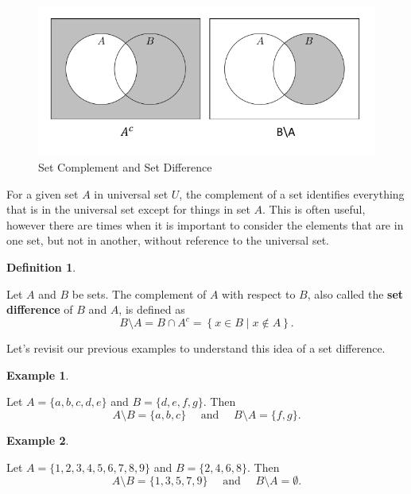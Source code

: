 \documentclass[
]{book}
\theoremstyle{definition}
\newtheorem{definition}{Definition}[chapter]
\theoremstyle{definition}
\newtheorem{example}{Example}[chapter]
\theoremstyle{definition}
\theoremstyle{definition}
\theoremstyle{remark}
\begin{document}
\begin{figure}

{\centering \includegraphics[width=0.8\linewidth]{tikz/set-difference} 

}

\caption{Set Complement and Set Difference}\label{fig:set-difference}
\end{figure}

For a given set \(A\) in universal set \(U\), the complement of a set identifies everything that is in the universal set except for things in set \(A\). This is often useful, however there are times when it is important to consider the elements that are in one set, but not in another, without reference to the universal set.

\begin{definition}
\protect\hypertarget{def:set-difference}{}\label{def:set-difference}

Let \(A\) and \(B\) be sets. The complement of \(A\) with respect to \(B\), also called the \textbf{set difference} of \(B\) and \(A\), is defined as \[B\setminus A = B \cap A^c = \left\{x\in B \middle \vert x \notin A\right\}.\]

\end{definition}

Let's revisit our previous examples to understand this idea of a set difference.

\begin{example}
\protect\hypertarget{exm:unlabeled-div-15}{}\label{exm:unlabeled-div-15}

Let \(A = \{a, b, c, d, e\}\) and \(B = \{ d, e, f, g\}\). Then \[A\setminus B=\{a, b, c\} \quad \mbox{ and } \quad  B\setminus A =\{ f, g\}.\]

\end{example}

\begin{example}
\protect\hypertarget{exm:unlabeled-div-16}{}\label{exm:unlabeled-div-16}

Let \(A=\{1,2,3,4,5,6,7,8,9\}\) and \(B=\{2,4,6,8\}\). Then
\[A \setminus B = \{1,3,5,7,9\} \quad \mbox{ and } \quad B\setminus A = \emptyset.\]

\end{example}
\end{document}
